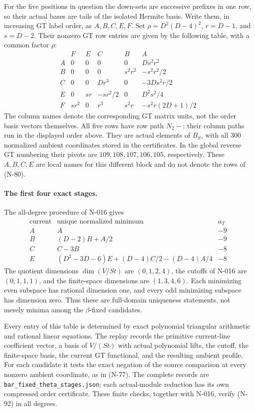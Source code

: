 For the five positions in question the down-sets are successive
prefixes in one row, so their actual bases are tails of the isolated
Hermite basis.  Write them, in increasing GT label order, as
$A,B,C,E,F$.  Set
$\rho=D^2(D-4)^2$, $r=D-1$, and $s=D-2$.  Their nonzero GT row entries
are given by the following table, with a common factor $\rho$:
\[
\begin{array}{c|ccccc}
 &F&E&C&B&A\\\hline
 A&0&0&0&0&Ds^2r^2\\
 B&0&0&0&s^2r^2&-s^2r^2/2\\
 C&0&0&Dr^3&0&-3Ds^2r/2\\
 E&0&sr&-sr^2/2&0&D^2s^2/4\\
 F&sr^2&0&r^3&s^2r&-s^2r(2D+1)/2
\end{array}
\tag{N-91}
\]
The column names denote the corresponding GT matrix units, not the
order basis vectors themselves.  All five rows have row path $N_2-$;
their column paths run in the displayed order above.  They are actual
elements of $B_S$, with all $300$ normalized ambient coordinates
stored in the certificates.  In the global reverse GT numbering
their pivots are $109,108,107,106,105$, respectively.  These $A,B,C,E$
are local names for this different block and do not denote the rows
of (N-80).

\paragraph{The first four exact stages.}
The all-degree procedure of N-016 gives
\[
\begin{array}{c|l|r}
\text{current}&\text{unique normalized minimum}&a_T\\\hline
 A&A&-9\\
 B&(D-2)B+A/2&-9\\
 C&C-3B&-8\\
 E&(D^2-3D-6)E+(D-4)C/2-(D-4)A/4&-8
\end{array}
\tag{N-92}
\]
The quotient dimensions $\dim(V/St)$ are $(0,1,2,4)$, the cutoffs of
N-016 are $(0,1,1,1)$, and the finite-space dimensions are $(1,3,4,6)$.
Each minimizing even subspace has rational dimension one,
and every odd minimizing subspace has dimension zero.  Thus these
are full-domain uniqueness statements, not merely minima among the
$\beta$-fixed candidates.

Every entry of this table is determined by exact polynomial
triangular arithmetic and rational linear equations.  The replay
records the primitive current-line coefficient vector, a basis of
$V/(St)$ with actual polynomial lifts, the cutoff, the finite-space
basis, the current GT functional, and the resulting ambient profile.
For each candidate it tests the exact negation of the source
comparison at every nonzero ambient coordinate, as in (N-77).
The complete records are
\nolinkurl{bar_fixed_theta_stages.json}; each actual-module reduction
has its own compressed order certificate.  These finite checks,
together with N-016, verify (N-92) in all degrees.


